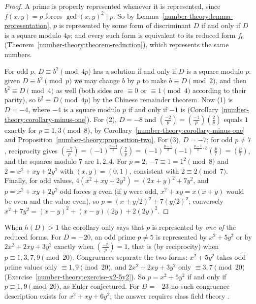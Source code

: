\begin{proof}
A prime is properly represented whenever it is represented, since $f(x, y) = p$ forces $\gcd(x, y)^2 \mid p$. So by Lemma~\ref{number-theory:lemma-representation}, $p$ is represented by some form of
discriminant $D$ if and only if $D$ is a square modulo $4p$; and every such form is equivalent to its reduced form $f_0$ (Theorem~\ref{number-theory:theorem-reduction}), which represents the same numbers.

For odd $p$, $D \equiv b^2 \pmod{4p}$ has a solution if and only if $D$ is a square modulo $p$: given $D \equiv b^2 \pmod p$ we may change $b$ by $p$ to make $b \equiv D \pmod 2$, and then $b^2 \equiv D \pmod 4$
as well (both sides are $\equiv 0$ or $\equiv 1 \pmod 4$ according to their parity), so $b^2 \equiv D \pmod{4p}$ by the Chinese remainder theorem. Now (1) is $D = -4$, where $-4$ is a square modulo $p$ if and
only if $-1$ is (Corollary~\ref{number-theory:corollary-minus-one}). For (2), $D = -8$ and $(\frac{-2}{p}) = (\frac{-1}{p})(\frac{2}{p})$ equals $1$ exactly for $p \equiv 1, 3 \pmod 8$, by
Corollary~\ref{number-theory:corollary-minus-one} and Proposition~\ref{number-theory:proposition-two}. For (3), $D = -7$; for odd $p \neq 7$, reciprocity gives
$(\frac{-7}{p}) = (-1)^{\frac{p-1}{2}}(\frac{7}{p}) = (-1)^{\frac{p-1}{2}}(-1)^{\frac{p-1}{2}\cdot3}(\frac{p}{7}) = (\frac{p}{7})$, and the squares modulo $7$ are $1, 2, 4$. For $p = 2$, $-7 \equiv 1 = 1^2 \pmod 8$
and $2 = x^2 + xy + 2y^2$ with $(x, y) = (0, 1)$, consistent with $2 \equiv 2 \pmod 7$. Finally, for odd values, $4(x^2 + xy + 2y^2) = (2x + y)^2 + 7y^2$, and $p = x^2 + xy + 2y^2$ odd forces $y$ even (if $y$
were odd, $x^2 + xy = x(x + y)$ would be even and the value even), so $p = (x + y/2)^2 + 7(y/2)^2$; conversely $x^2 + 7y^2 = (x - y)^2 + (x - y)(2y) + 2(2y)^2$.
\end{proof}

When $h(D) > 1$ the corollary only says that $p$ is represented by \emph{one of} the reduced forms. For $D = -20$, an odd prime $p \neq 5$ is represented by $x^2 + 5y^2$ or by $2x^2 + 2xy + 3y^2$ exactly
when $(\frac{-5}{p}) = 1$, that is (by reciprocity) when $p \equiv 1, 3, 7, 9 \pmod{20}$. Congruences separate the two forms: $x^2 + 5y^2$ takes odd prime values only $\equiv 1, 9 \pmod{20}$, and
$2x^2 + 2xy + 3y^2$ only $\equiv 3, 7 \pmod{20}$ (Exercise~\ref{number-theory:exercise-x2-5y2}). So $p = x^2 + 5y^2$ if and only if $p \equiv 1, 9 \pmod{20}$, as Euler conjectured. For $D = -23$ no such
congruence description exists for $x^2 + xy + 6y^2$; the answer requires class field theory \cite{cox-primes}.

